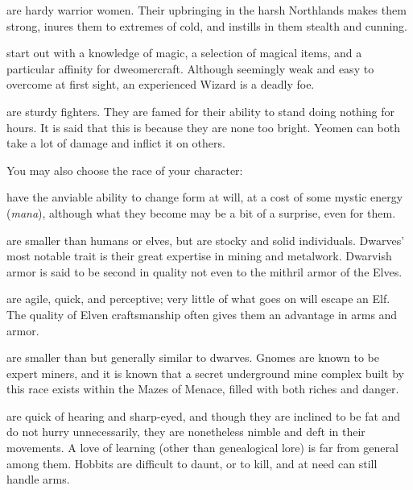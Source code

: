 \item[\bb{Valkyries}]%
are hardy warrior women.  Their upbringing in the harsh
Northlands makes them strong, inures them to extremes of cold, and instills
in them stealth and cunning.

\item[\bb{Wizards}]%
start out with a knowledge of magic, a selection of magical
items, and a particular affinity for dweomercraft.  Although seemingly weak
and easy to overcome at first sight, an experienced Wizard is a deadly foe.

\item[\bb{Yeomen}]%
are sturdy fighters. They are famed for their ability to stand
doing nothing for hours. It is said that this is because they are none too
bright. Yeomen can both take a lot of damage and inflict it on others.
\elist
\nd %

You may also choose the race of your character:
\blist{}

\item[\bb{Doppelgangers}]%
have the anviable ability to change form at will,  at
a cost of some mystic energy ({\it mana\/}),  although what they become
may be a bit of a surprise,  even for them.

\item[\bb{Dwarves}]%
are smaller than humans or elves, but are stocky and solid
individuals.  Dwarves' most notable trait is their great expertise in mining
and metalwork.  Dwarvish armor is said to be second in quality not even to the
mithril armor of the Elves.

\item[\bb{Elves {\rm and }Drows}]%
are agile, quick, and perceptive; very little of
what goes on will escape an Elf.  The quality of Elven craftsmanship often
gives them an advantage in arms and armor.

\item[\bb{Gnomes}]%
are smaller than but generally similar to dwarves.  Gnomes are
known to be expert miners, and it is known that a secret underground mine
complex built by this race exists within the Mazes of Menace, filled with
both riches and danger.

\item[\bb{Hobbits}]%
are quick of hearing and sharp-eyed, and though they are
inclined to be fat and do not hurry unnecessarily, they are nonetheless nimble
and deft in their movements. A love of learning (other than genealogical lore)
is far from general among them. Hobbits are difficult to daunt, or to kill,
and at need can still handle arms.

